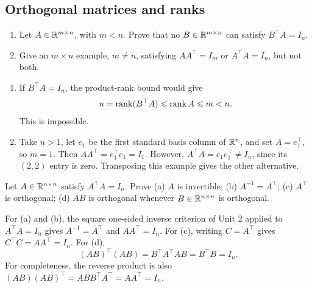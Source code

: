 \subsection*{Orthogonal matrices and ranks}

\begin{problem}\label{ex:06:rectangular-orthogonality}
\begin{enumerate}
\item Let \(A\in\mathbb R^{m\times n}\), with \(m<n\). Prove that no
\(B\in\mathbb R^{m\times n}\) can satisfy \(B^\top A=I_n\).
\item Give an \(m\times n\) example, \(m\ne n\), satisfying
\(AA^\top=I_m\) or \(A^\top A=I_n\), but not both.
\end{enumerate}
\end{problem}
\begin{solution}
\begin{enumerate}
\item If \(B^\top A=I_n\), the product-rank bound would give
\[
n=\operatorname{rank}(B^\top A)\leqslant\operatorname{rank} A\leqslant m<n.
\]
This is impossible.
\item Take \(n>1\), let \(e_1\) be the first standard basis column of
\(\mathbb R^n\), and set \(A=e_1^\top\), so \(m=1\).
Then \(AA^\top=e_1^\top e_1=I_1\). However,
\(A^\top A=e_1e_1^\top\ne I_n\), since its \((2,2)\) entry is zero.
Transposing this example gives the other alternative.
\end{enumerate}
\end{solution}

\begin{problem}\label{ex:06:orthogonal-matrices}
Let \(A\in\mathbb R^{n\times n}\) satisfy \(A^\top A=I_n\).
Prove
(a) \(A\) is invertible;
(b) \(A^{-1}=A^\top\);
(c) \(A^\top\) is orthogonal;
(d) \(AB\) is orthogonal whenever \(B\in\mathbb R^{n\times n}\) is orthogonal.
\end{problem}
\begin{solution}
For (a) and (b), the square one-sided inverse criterion of Unit 2
applied to \(A^\top A=I_n\) gives \(A^{-1}=A^\top\) and \(AA^\top=I_n\).
For (c), writing \(C=A^\top\) gives \(C^\top C=AA^\top=I_n\).
For (d),
\[
(AB)^\top(AB)=B^\top A^\top AB=B^\top B=I_n.
\]
For completeness, the reverse product is also
\((AB)(AB)^\top=ABB^\top A^\top=AA^\top=I_n\).
\end{solution}


